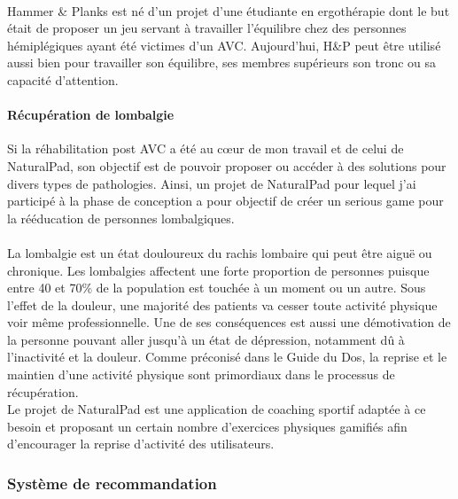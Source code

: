\paragraph{}Hammer \& Planks est né d'un projet d'une étudiante en ergothérapie dont le but était de proposer un jeu servant à travailler l'équilibre chez des personnes hémiplégiques ayant été victimes d'un AVC. Aujourd'hui, H\&P peut être utilisé aussi bien pour travailler son équilibre, ses membres supérieurs son tronc ou sa capacité d'attention.

	\paragraph{Récupération de lombalgie\\}
Si la réhabilitation post AVC a été au cœur de mon travail et de celui de NaturalPad, son objectif est de pouvoir proposer ou accéder à des solutions pour divers types de pathologies. Ainsi, un projet de NaturalPad pour lequel j'ai participé à la phase de conception a pour objectif de créer un serious game pour la rééducation de personnes lombalgiques.
\paragraph{}
La lombalgie est un état douloureux du rachis lombaire qui peut être aiguë ou chronique. Les lombalgies affectent une forte proportion de personnes puisque entre 40 et 70\% de la population est touchée à un moment ou un autre. Sous l'effet de la douleur, une majorité des patients va cesser toute activité physique voir même professionnelle. Une de ses conséquences est aussi une démotivation de la personne pouvant aller jusqu'à un état de dépression, notamment dû à l'inactivité et la douleur. Comme préconisé dans le Guide du Dos\cite{backbook}, la reprise et le maintien d'une activité physique sont primordiaux dans le processus de récupération. \\
Le projet de NaturalPad est une application de coaching sportif adaptée à ce besoin et proposant un certain nombre d'exercices physiques gamifiés afin d'encourager la reprise d'activité des utilisateurs.	




	\subsubsection{Système de recommandation }
	
